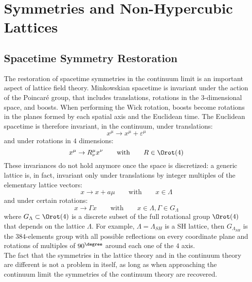 \pagestyle{myFancy}
\chapter{Symmetries and Non-Hypercubic Lattices\label{Chap:F4Lattice}}

\section{Spacetime Symmetry Restoration}
The restoration of spacetime symmetries in the continuum limit is an important aspect of lattice field theory.
Minkowskian spacetime is invariant under the action of the Poincaré group, that includes translations, rotations in the $3$-dimensional space, and boosts.
When performing the Wick rotation, boosts become rotations in the planes formed by each spatial axis and the Euclidean time.
The Euclidean spacetime is therefore invariant, in the continuum, under translations:
\begin{equation}
    x^\mu \to x^\mu + \varepsilon^\mu \label{3:TranslCont}
\end{equation}
and under rotations in $4$ dimensions:
\begin{equation}
    x^\mu \to R^\mu_\nu x^\nu \qquad\text{with}\qquad R\in\Orot(4) \label{3:RotCont}
\end{equation}
These invariances do not hold anymore once the space is discretized: a generic lattice is, in fact, invariant only under translations by integer multiples of the elementary lattice vectors:
\begin{equation}
    x \to x + a\mu \qquad\text{with}\qquad x\in\Lambda \label{3:TraslDiscr}
\end{equation}
and under certain rotations:
\begin{equation}
    x \to \Gamma x \qquad\text{with}\qquad x\in\Lambda, \Gamma\in G_\Lambda \label{3:RotDiscr}
\end{equation}
where $G_\Lambda\subset\Orot(4)$ is a discrete subset of the full rotational group $\Orot(4)$ that depends on the lattice $\Lambda$.
For example, $\Lambda=\Lambda_{SH}$ is a SH lattice, then $G_{\Lambda_{SH}}$ is the $384$-elements group with all possible reflections on every coordinate plane and rotations of multiples of $90^\degree$ around each one of the $4$ axis.\\
The fact that the symmetries in the lattice theory and in the continuum theory are different is not a problem in itself, as long as when approaching the continuum limit the symmetries of the continuum theory are recovered.
